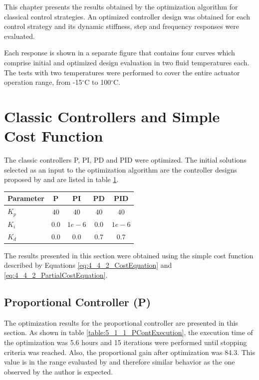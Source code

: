 
This chapter presents the results obtained by the optimization algorithm for classical control strategies. An optimized controller design was obtained for each control strategy and its dynamic stiffness, step  and frequency responses were evaluated. 

Each response is shown in a separate figure that contains four curves which comprise initial and optimized design evaluation in two fluid temperatures each. The tests with two temperatures were performed to cover the entire actuator operation range, from -15$^{\circ}$C to 100$^{\circ}$C.

\section{Classic Controllers and Simple Cost Function}

The classic controllers P, PI, PD and PID were optimized. The initial solutions selected as an input to the optimization algorithm are the controller designs proposed by  and are listed in table \ref{table:5_1_InitSolutTable}.

\begin{table}[H]
	\label{table:5_1_InitSolutTable}
	\centering
	\resizebox{8cm}{!} {
		\begin{tabular}{|l|c|c|c|c|}
			\hline
			Parameter & P & PI 		& PD 	& PID 	\\ \hline
			$K_p$ & $40$  & $40$	& $40$	& $40$	\\ \hline
			$K_i$ & $0.0$ & $1e-6$	& $0.0$ & $1e-6$\\ \hline
			$K_d$ & $0.0$ & $0.0$	& $0.7$ & $0.7$ \\ \hline
	\end{tabular}}
\end{table}

The results presented in this section were obtained using the simple cost function described by Equations \ref{eq:4_4_2_CostEquation} and \ref{eq:4_4_2_PartialCostEquation}.

\subsection{Proportional Controller (P)}

The optimization results for the proportional controller are presented in this section. As shown in table \ref{table:5_1_1_PContExecution}, the execution time of the optimization was 5.6 hours and 15 
iterations were performed until stopping criteria was reached. Also, the proportional gain after optimization was 84.3. This value is in the range evaluated by  and therefore similar behavior as the one observed by the author is expected. 

